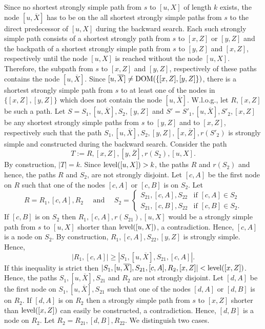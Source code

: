 \documentclass[12pt,twoside,a4paper]{article}
\def\DOM{{\rm DOM}}
\def\lev{{\rm level}}
\begin{document}
Since no shortest strongly simple path from $s$ to $[u,X]$ of length $k$ exists, the node
$[u,\overline{X}]$ has to be on the all shortest strongly simple paths from $s$ to the direct
predecessor of $[u,X]$ during the backward search. Each such strongly simple path consists of
a shortest strongly path from $s$ to $[x,Z]$ or $[y,Z]$ and the backpath of a shortest strongly 
simple path from $s$ to $[y,Z]$ and $[x,Z]$, respectively until the node $[u,X]$ is reached 
without the node $[u,X]$. Therefore, the subpath from $s$ to $[x,Z]$ and $[y,Z]$, 
respectively of these paths contains the node $[u,\overline{X}]$.
Since $[u,\overline{X}] \not= \DOM(\{[x,Z],[y,Z]\})$, there is a shortest strongly simple path 
from $s$ to at least one of the nodes in $\{[x,Z],[y,Z]\}$ which does not contain the node 
$[u,\overline{X}]$. W.l.o.g., let $R,[x,Z]$ be such a path.
Let $S = S_1,[u,\overline{X}],S_2,[y,Z]$ and $S' = S'_1,[u,\overline{X}],S'_2,[x,Z]$ be any 
shortest strongly simple paths from $s$ to $[y,Z]$ and to $[x,Z]$, respectively such that
the path $S_1,[u,\overline{X}],S_2,[y,Z],[x,\overline{Z}],r(S'_2)$ 
is strongly simple and constructed during the backward search. Consider the path
$$T := R,[x,Z],[y,\overline{Z}],r(S_2),[u,X].$$
By construction, $|T| = k$. Since $\lev([u,X]) > k$, the paths $R$ and $r(S_2)$ and hence, the
paths $R$ and $S_2$, are not strongly disjoint. Let $[c,A]$ be the first node on $R$ 
such that one of the nodes $[c,A]$ or $[c,B]$ is on $S_2$. Let
$$R = R_1,[c,A],R_2 \quad \mbox{ and } \quad 
S_2 = \left\{ \begin{array}{ll}
               S_{21},[c,A],S_{22} & \mbox{if $[c,A] \in S_2$} \\
               S_{21},[c,B],S_{22} & \mbox{if $[c,B] \in S_2$.} 
              \end{array} \right.
$$
If $[c,B]$ is on $S_2$ then $R_1,[c,A],r(S_{21}),[u,X]$ would be a strongly simple path from
$s$ to $[u,X]$ shorter than $\lev([u,X])$, a contradiction. Hence, $[c,A]$ is a node on $S_2$.
By construction, $R_1,[c,A],S_{22},[y,Z]$ is strongly simple. Hence, 
$$|R_1,[c,A]| \geq |S_1,[u,\overline{X}],S_{21},[c,A]|.$$
If this inequality is strict then $|S_1,[u,\overline{X}],S_{21},[c,A],R_2,[x,Z]| < \lev([x,Z])$.
Hence, the paths $S_1,[u,\overline{X}],S_{21}$ and $R_2$ are not strongly disjoint. 
Let $[d,A]$ be the first node on $S_1,[u,\overline{X}],S_{21}$ such that one of the nodes
$[d,A]$ or $[d,B]$ is on $R_2$. If $[d,A]$ is on $R_2$ then a strongly simple path from $s$
to $[x,Z]$ shorter than $\lev([x,Z])$ can easily be constructed, a contradiction. Hence, $[d,B]$ is 
a node on $R_2$. Let $R_2 = R_{21},[d,B],R_{22}$.  We distinguish two cases.
\end{document}
